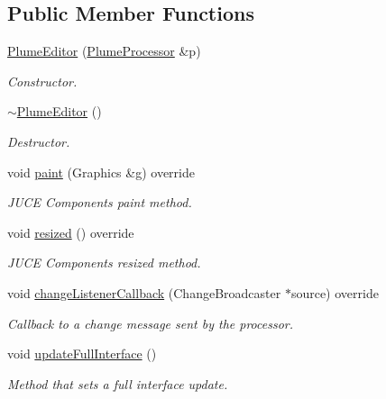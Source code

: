 \subsection*{Public Member Functions}
\begin{DoxyCompactItemize}
\item 
\mbox{\hyperlink{class_plume_editor_a0b9b4a952769836ca43c49ed020951f9}{Plume\+Editor}} (\mbox{\hyperlink{class_plume_processor}{Plume\+Processor}} \&p)
\begin{DoxyCompactList}\small\item\em Constructor. \end{DoxyCompactList}\item 
\mbox{\label{class_plume_editor_af16dd852a3419961627d070d62e3e644}} 
\mbox{\hyperlink{class_plume_editor_af16dd852a3419961627d070d62e3e644}{$\sim$\+Plume\+Editor}} ()
\begin{DoxyCompactList}\small\item\em Destructor. \end{DoxyCompactList}\item 
\mbox{\label{class_plume_editor_a3b31e2023faf921f446b132b24a917c0}} 
void \mbox{\hyperlink{class_plume_editor_a3b31e2023faf921f446b132b24a917c0}{paint}} (Graphics \&g) override
\begin{DoxyCompactList}\small\item\em J\+U\+CE Components\textquotesingle{} paint method. \end{DoxyCompactList}\item 
\mbox{\label{class_plume_editor_aa42064f898f3a543173c5b29c7b2932c}} 
void \mbox{\hyperlink{class_plume_editor_aa42064f898f3a543173c5b29c7b2932c}{resized}} () override
\begin{DoxyCompactList}\small\item\em J\+U\+CE Components\textquotesingle{} resized method. \end{DoxyCompactList}\item 
void \mbox{\hyperlink{class_plume_editor_a5d593b33e5e4e33827928dbcdc272416}{change\+Listener\+Callback}} (Change\+Broadcaster $\ast$source) override
\begin{DoxyCompactList}\small\item\em Callback to a change message sent by the processor. \end{DoxyCompactList}\item 
void \mbox{\hyperlink{class_plume_editor_acddc96d095aeb53f7a4ee6cf1f3265e6}{update\+Full\+Interface}} ()
\begin{DoxyCompactList}\small\item\em Method that sets a full interface update. \end{DoxyCompactList}\end{DoxyCompactItemize}


